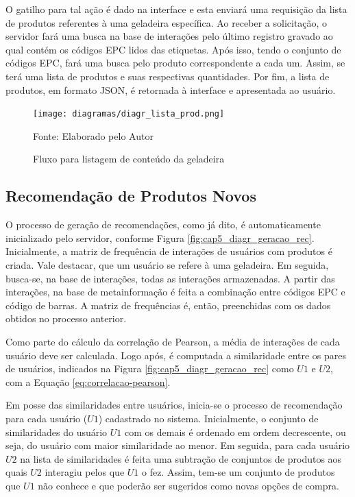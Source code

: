 O gatilho para tal ação é dado na interface e esta enviará uma requisição da lista de produtos referentes à uma geladeira específica. Ao receber a solicitação, o servidor fará uma busca na base de interações pelo último registro gravado ao qual contém os códigos EPC lidos das etiquetas. Após isso, tendo o conjunto de códigos EPC, fará uma busca pelo produto correspondente a cada um. Assim, se terá uma lista de produtos e suas respectivas quantidades. Por fim, a lista de produtos, em formato JSON, é retornada à interface e apresentada ao usuário.

\begin{figure}[htb]
    \caption{Fluxo para listagem de conteúdo da geladeira}
    \label{fig:cap5_diagr_lista_prod}
    \texttt{[image: diagramas/diagr\_lista\_prod.png]}
    
    \footnotesize{Fonte: Elaborado pelo Autor}
\end{figure}

\subsection{Recomendação de Produtos Novos} \label{ssec:geracao_rec_novo}

O processo de geração de recomendações, como já dito, é automaticamente inicializado pelo servidor, conforme Figura \ref{fig:cap5_diagr_geracao_rec}. Inicialmente, a matriz de frequência de interações de usuários com produtos é criada. Vale destacar, que um usuário se refere à uma geladeira. Em seguida, busca-se, na base de interações, todas as interações armazenadas. A partir das interações, na base de metainformação é feita a combinação entre códigos EPC e código de barras. A matriz de frequências é, então, preenchidas com os dados obtidos no processo anterior.

Como parte do cálculo da correlação de Pearson, a média de interações de cada usuário deve ser calculada. Logo após, é computada a similaridade entre os pares de usuários, indicados na Figura \ref{fig:cap5_diagr_geracao_rec} como $U1$ e $U2$, com a Equação \ref{eq:correlacao-pearson}.

Em posse das similaridades entre usuários, inicia-se o processo de recomendação para cada usuário ($U1$) cadastrado no sistema. Inicialmente, o conjunto de similaridades do usuário $U1$ com os demais é ordenado em ordem decrescente, ou seja, do usuário com maior similaridade ao menor. Em seguida, para cada usuário $U2$ na lista de similaridades é feita uma subtração de conjuntos de produtos aos quais $U2$ interagiu pelos que $U1$ o fez. Assim, tem-se um conjunto de produtos que $U1$ não conhece e que poderão ser sugeridos como novas opções de compra. 

